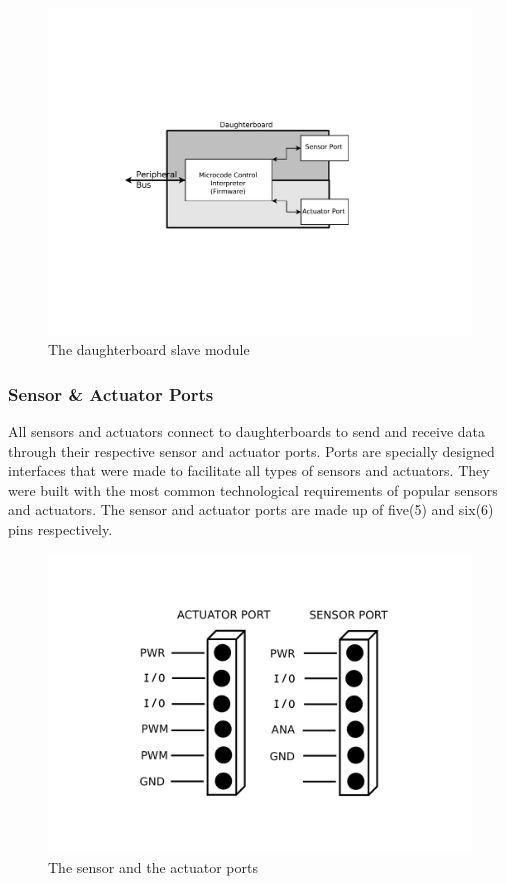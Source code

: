 	\begin{figure}[h]
	  \begin{center}
	    \includegraphics[width=1.0\columnwidth]{Figures/db.pdf}
	    \caption{The daughterboard slave module}
	  \end{center}
	\end{figure}
	
	\subsubsection{Sensor \& Actuator Ports} %
	\label{ssub:input_&_output_ports}
	All sensors and actuators connect to daughterboards to send and receive data through their respective sensor and actuator ports. Ports are specially designed interfaces that were made to facilitate all types of sensors and actuators. They were built with the most common technological requirements of popular sensors and actuators. The sensor and actuator ports are made up of five(5) and six(6) pins respectively.

\begin{figure}[h]
  \begin{center}
    \includegraphics[width=0.5\columnwidth]{Figures/Ports.pdf}
    \caption{The sensor and the actuator ports}
  \end{center}
\end{figure}

